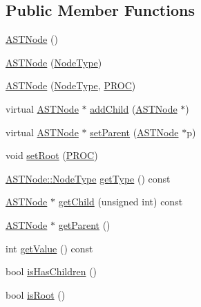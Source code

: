 \subsection*{Public Member Functions}
\begin{DoxyCompactItemize}
\item 
\hyperlink{class_a_s_t_node_a1196ed4f19c0b62cdc42fe35946b91d2}{A\-S\-T\-Node} ()
\item 
\hyperlink{class_a_s_t_node_a512c4363de4ceef82b6189e1dbd34ec1}{A\-S\-T\-Node} (\hyperlink{class_a_s_t_node_a4fd016b5f0e44ea6aca3542d27de3859}{Node\-Type})
\item 
\hyperlink{class_a_s_t_node_a97d3345ffb311a0582a8bf1478722a70}{A\-S\-T\-Node} (\hyperlink{class_a_s_t_node_a4fd016b5f0e44ea6aca3542d27de3859}{Node\-Type}, \hyperlink{std_afx_8h_aa07ea1d188c7b45668f1bd82ffd6d87e}{P\-R\-O\-C})
\item 
virtual \hyperlink{class_a_s_t_node}{A\-S\-T\-Node} $\ast$ \hyperlink{class_a_s_t_node_a595fb15c3e37a7a9e443742dca6483ca}{add\-Child} (\hyperlink{class_a_s_t_node}{A\-S\-T\-Node} $\ast$)
\item 
virtual \hyperlink{class_a_s_t_node}{A\-S\-T\-Node} $\ast$ \hyperlink{class_a_s_t_node_a70e8aa10baa353684ae8288f3460a5fc}{set\-Parent} (\hyperlink{class_a_s_t_node}{A\-S\-T\-Node} $\ast$p)
\item 
void \hyperlink{class_a_s_t_node_a05a02c02535ef19457cccaf511d594e7}{set\-Root} (\hyperlink{std_afx_8h_aa07ea1d188c7b45668f1bd82ffd6d87e}{P\-R\-O\-C})
\item 
\hyperlink{class_a_s_t_node_a4fd016b5f0e44ea6aca3542d27de3859}{A\-S\-T\-Node\-::\-Node\-Type} \hyperlink{class_a_s_t_node_afa85380e2e00c7b3166d61ae696b8365}{get\-Type} () const 
\item 
\hyperlink{class_a_s_t_node}{A\-S\-T\-Node} $\ast$ \hyperlink{class_a_s_t_node_a68ef18e60e551c9ba047e3d1809d8620}{get\-Child} (unsigned int) const 
\item 
\hyperlink{class_a_s_t_node}{A\-S\-T\-Node} $\ast$ \hyperlink{class_a_s_t_node_a62e103d706cfbace82cf124bbd080c3e}{get\-Parent} ()
\item 
int \hyperlink{class_a_s_t_node_a899c8bb0314158fc8ca7d5688b89e165}{get\-Value} () const 
\item 
bool \hyperlink{class_a_s_t_node_ae26a0a4a3beebf3ef460ff603cbc3a97}{is\-Has\-Children} ()
\item 
bool \hyperlink{class_a_s_t_node_aba44d4dd6234cab7a2c3f153b65bd97f}{is\-Root} ()
\end{DoxyCompactItemize}
